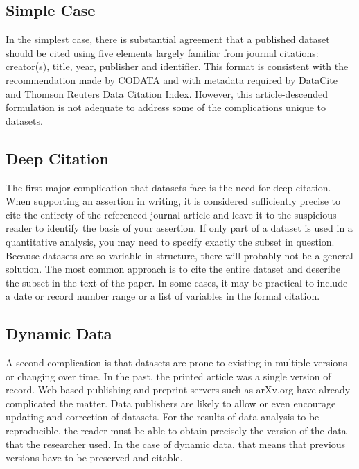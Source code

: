 \documentclass[10pt,a4paper,twocolumn]{article}
\begin{document}
\subsection*{Simple Case}\label{simple-case}

In the simplest case, there is substantial agreement that a published dataset should be cited using five elements largely familiar from journal citations: creator(s), title, year, publisher and identifier. 
This format is consistent with the recommendation made by CODATA\cite{socha_out_2013} and with metadata required by DataCite \cite{datacite_datacite_2013} and Thomson Reuters Data Citation Index. However, this article-descended formulation is not adequate to address some of the complications unique to datasets.

\subsection*{Deep Citation}\label{deep-citation}

The first major complication that datasets face is the need for deep citation. 
When supporting an assertion in writing, it is considered sufficiently precise to cite the entirety of the referenced journal article and leave it to the suspicious reader to identify the basis of your assertion. 
If only part of a dataset is used in a quantitative analysis, you may need to specify exactly the subset in question. 
Because datasets are so variable in structure, there will probably not be a general solution. 
The most common approach is to cite the entire dataset and describe the subset in the text of the paper. 
In some cases, it may be practical to include a date or record number range or a list of variables in the formal citation.

\subsection*{Dynamic Data}\label{dynamic-data}

A second complication is that datasets are prone to existing in multiple versions or changing over time. 
In the past, the printed article was a single version of record.
Web based publishing and preprint servers such as arXv.org have already complicated the matter. 
Data publishers are likely to allow or even encourage updating and correction of datasets. 
For the results of data analysis to be reproducible, the reader must be able to obtain precisely the version of the data that the researcher used. 
In the case of dynamic data, that means that previous versions have to be preserved and citable.
\end{document}
